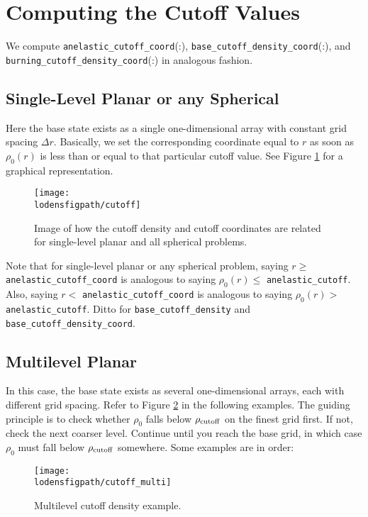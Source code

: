 \section{Computing the Cutoff Values}
We compute {\tt anelastic\_cutoff\_coord}(:), {\tt base\_cutoff\_density\_coord}(:), 
and {\tt burning\_cutoff\_density\_coord}(:) in analogous fashion.

\subsection{Single-Level Planar or any Spherical}
Here the base state exists as a single one-dimensional array with constant grid
spacing $\Delta r$.  Basically, we set the corresponding coordinate equal to $r$ as soon 
as $\rho_0(r)$ is less than  or equal to that particular cutoff value.
See Figure \ref{Fig:Cutoff} for a graphical representation.
\begin{figure}[hpb]
\centering
\texttt{[image: \\lodensfigpath/cutoff]}\hspace{0.2in}
\caption[Cutoff density and coordinates]{Image of how the cutoff density and cutoff coordinates
are related for single-level planar and all spherical problems.}
\label{Fig:Cutoff}
\end{figure}

Note that for single-level planar or any spherical problem, saying $r\ge$ {\tt anelastic\_cutoff\_coord} is analogous to saying $\rho_0(r)\le$ {\tt anelastic\_cutoff}.  Also, saying $r<$ {\tt anelastic\_cutoff\_coord} is analogous to saying $\rho_0(r)>$ {\tt anelastic\_cutoff}.  Ditto for {\tt base\_cutoff\_density} and {\tt base\_cutoff\_density\_coord}.

\subsection{Multilevel Planar}
In this case, the base state exists as several one-dimensional arrays, each with
different grid spacing.  Refer to Figure \ref{Fig:Cutoff_Multi} in the following examples.
The guiding principle is to check whether $\rho_0$ falls below $\rho_{\rm cutoff}$ on the finest
grid first.  If not, check the next coarser level.  Continue until you reach the base grid,
in which case $\rho_0$ must fall below $\rho_{\rm cutoff}$ somewhere.  Some examples are in order:
\begin{figure}[hpb]
\centering
\texttt{[image: \\lodensfigpath/cutoff\_multi]}\hspace{0.2in}
\caption{Multilevel cutoff density example.}
\label{Fig:Cutoff_Multi}
\end{figure}

